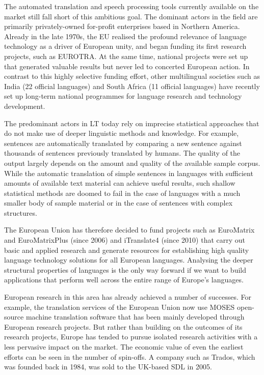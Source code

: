 \begin{multicols}{2}
The automated translation and speech processing tools currently available on the market still fall short of this ambitious goal. The dominant actors in the field are primarily privately-owned for-profit enterprises based in Northern America. Already in the late 1970s, the EU realised the profound relevance of language technology as a driver of European unity, and began funding its first research projects, such as EUROTRA. At the same time, national projects were set up that generated valuable results but never led to concerted European action. In contrast to this highly selective funding effort, other multilingual societies such as India (22 official languages) and South Africa (11 official languages) have recently set up long-term national programmes for language research and technology development. 

    The predominant actors in LT today rely on imprecise statistical approaches that do not make use of deeper linguistic methods and knowledge. For example, sentences are automatically translated by comparing a new sentence against thousands of sentences previously translated by humans. The quality of the output largely depends on the amount and quality of the available sample corpus. While the automatic translation of simple sentences in languages with sufficient amounts of available text material can achieve useful results, such shallow statistical methods are doomed to fail in the case of languages with a much smaller body of sample material or in the case of sentences with complex structures.

   The European Union has therefore decided to fund projects such as EuroMatrix and EuroMatrixPlus (since 2006) and iTranslate4 (since 2010) that carry out basic and applied research and generate resources for establishing high quality language technology solutions for all European languages. Analysing the deeper structural properties of languages is the only way forward if we want to build applications that perform well across the entire range of Europe’s languages.

    European research in this area has already achieved a number of successes. For example, the translation services of the European Union now use MOSES open-source machine translation software that has been mainly developed through European research projects. But rather than building on the outcomes of its research projects, Europe has tended to pursue isolated research activities with a less pervasive impact on the market.  The economic value of even the earliest efforts can be seen in the number of spin-offs. A company such as Trados, which was founded back in 1984, was sold to the UK-based SDL in 2005.


\end{multicols}
